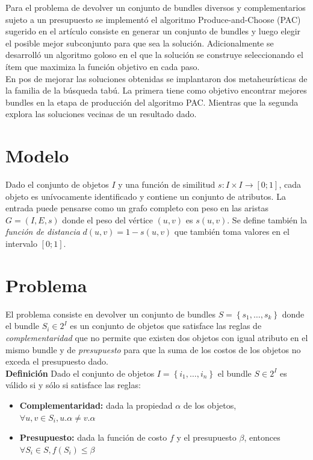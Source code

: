 Para el problema de devolver un conjunto de bundles diversos y complementarios sujeto a un presupuesto se implementó el algoritmo Produce-and-Choose (PAC) sugerido en el artículo \cite{compositeRetrival} consiste en generar un conjunto de bundles y luego elegir el posible mejor subconjunto para que sea la solución. Adicionalmente se desarrolló un algoritmo goloso en el que la solución se construye seleccionando el ítem que maximiza la función objetivo en cada paso.\\
En pos de mejorar las soluciones obtenidas se implantaron dos metaheurísticas de la familia de la búsqueda tabú. La primera tiene como objetivo encontrar mejores bundles en la etapa de producción del algoritmo PAC. Mientras que la segunda explora las soluciones vecinas de un resultado dado.\\
\section{Modelo}
Dado el conjunto de objetos $I$ y una función de similitud $ s: I \times I \rightarrow [0;1]$, cada objeto es unívocamente identificado y contiene un conjunto de atributos. La entrada puede pensarse como un grafo completo con peso en las aristas $G=(I,E,s)$ donde el peso del vértice $(u,v)$ es $s(u,v)$. Se define también la \textit{función de distancia} $d(u,v) = 1 - s(u,v)$ que también toma valores en el intervalo $[0;1]$.

\section{Problema}
El problema consiste en devolver un conjunto de bundles $S = \left\{s_1, \ldots, s_k\right\}$ donde el bundle $S_i \in 2^{I}$ es un conjunto de objetos que satisface las reglas de \textit{complementaridad} que no permite que existen dos objetos con igual atributo en el mismo bundle y de \textit{presupuesto} para que la suma de los costos de los objetos no exceda el presupuesto dado.\\
\textbf{Definición} Dado el conjunto de objetos $I=\left\{i_1,\ldots, i_n\right\}$ el bundle $S \in 2^{I}$ es válido si y sólo si satisface las reglas:
\begin{itemize}
	\item \textbf{Complementaridad:} dada la propiedad $\alpha$ de los objetos, $\forall u,v \in S_i, u.\alpha \neq v.\alpha$
	\item \textbf{Presupuesto:} dada la función de costo $f$ y el presupuesto $\beta$, entonces $\forall S_i \in S, f(S_i) \leq \beta$
\end{itemize}

